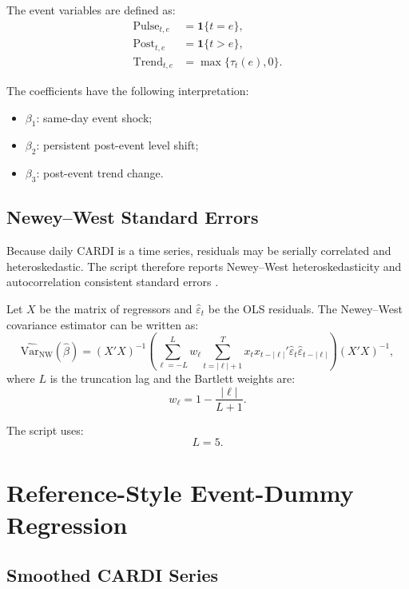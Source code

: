 \documentclass[11pt]{article}
\begin{document}
The event variables are defined as:
\begin{align}
\text{Pulse}_{t,e}
&=
\mathbf{1}\{t=e\},\\
\text{Post}_{t,e}
&=
\mathbf{1}\{t>e\},\\
\text{Trend}_{t,e}
&=
\max\{\tau_t(e),0\}.
\end{align}

The coefficients have the following interpretation:
\begin{itemize}
  \item \(\beta_1\): same-day event shock;
  \item \(\beta_2\): persistent post-event level shift;
  \item \(\beta_3\): post-event trend change.
\end{itemize}

\subsection{Newey--West Standard Errors}

Because daily CARDI is a time series, residuals may be serially correlated and
heteroskedastic. The script therefore reports Newey--West heteroskedasticity
and autocorrelation consistent standard errors \citep{neweywest1987}.

Let \(X\) be the matrix of regressors and \(\hat{\varepsilon}_t\) be the OLS
residuals. The Newey--West covariance estimator can be written as:
\begin{equation}
\widehat{\mathrm{Var}}_{\mathrm{NW}}(\hat{\beta})
=
(X'X)^{-1}
\left(
\sum_{\ell=-L}^{L} w_\ell
\sum_{t=|\ell|+1}^{T}
x_t x_{t-|\ell|}' \hat{\varepsilon}_t \hat{\varepsilon}_{t-|\ell|}
\right)
(X'X)^{-1},
\end{equation}
where \(L\) is the truncation lag and the Bartlett weights are:
\begin{equation}
w_\ell = 1 - \frac{|\ell|}{L+1}.
\end{equation}

The script uses:
\[
L=5.
\]

\section{Reference-Style Event-Dummy Regression}

\subsection{Smoothed CARDI Series}
\end{document}
